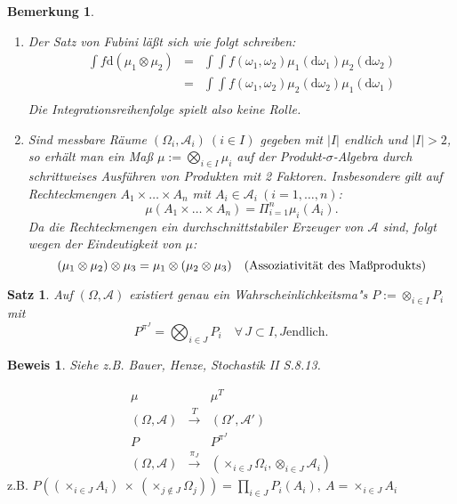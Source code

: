 \documentclass[a4paper,11pt]{book}
\def\AA{ \mathcal{A} }
\def\d{\mbox{d}}
\newtheorem{Sa}{Satz}[chapter]
\newtheorem{Bem}{Bemerkung}[chapter]
\theoremstyle{nonumberplain}
\newtheorem{Bew}{Beweis}
\begin{document}
\begin{Bem} \quad\\
\begin{enumerate}
\item[a)] Der Satz von Fubini läßt sich wie folgt schreiben:
\begin{eqnarray*}
\int f\d\left(\mu_1\otimes\mu_2\right) & = & \int\int f\left(\omega_1,\omega_2\right)\mu_1\left(\d\omega_1\right)\mu_2\left(\d\omega_2\right) \\
 & = & \int\int f\left(\omega_1,\omega_2\right)\mu_2\left(\d\omega_2\right)\mu_1\left(\d\omega_1\right) \\
\end{eqnarray*}
Die Integrationsreihenfolge spielt also keine Rolle.
\item[b)] Sind messbare Räume $(\Omega_i,\AA_i)\ (i\in I)$ gegeben mit $|I|$ endlich und $|I|>2$, so erhält man ein Maß $\mu:=\bigotimes_{i\in I}\mu_i$ auf der Produkt-$\sigma$-Algebra durch schrittweises Ausführen von Produkten mit 2 Faktoren. Insbesondere gilt auf Rechteckmengen $A_1\times\dots\times A_n$ mit $A_i\in\AA_i\ (i=1,\dots,n)$:
$$\mu(A_1\times\dots\times A_n) = \Pi_{i=1}^n\mu_i(A_i).$$
Da die Rechteckmengen ein durchschnittstabiler Erzeuger von $\AA$ sind, folgt wegen der Eindeutigkeit von $\mu$: \\
$$(\mu_1\otimes\mu_2)\otimes\mu_3 = \mu_1\otimes(\mu_2\otimes\mu_3)\text{\quad(Assoziativität des Maßprodukts)}$$
\end{enumerate}
\end{Bem}

\begin{Sa}
Auf $(\Omega,\AA)$ existiert genau ein Wahrscheinlichkeitsma"s $P:= \otimes_{i \in I} P_i$ 
mit
$$P^{\pi^J} = \bigotimes_{i \in J}P_i \quad \forall\, J \subset I, J \text{endlich}.$$
\end{Sa}

\begin{Bew}
Siehe z.B. Bauer, Henze, Stochastik II S.8.13.
\end{Bew}

\[
\begin{array}{ccc}
\mu & & \mu^T \\
(\Omega,\AA) & \stackrel{T}{\longrightarrow} & (\Omega',\AA') \\
P & & P^{\pi^J} \\
(\Omega,\AA) & \stackrel{\pi_J}{\longrightarrow} & (\times_{i \in J} 
\Omega_i, \otimes_{i \in J} \AA_i)
\end{array}
\]
z.B. $P((\times_{i \in J} A_i)\ \times\ (\times_{j \notin J} \Omega_j)) = 
\prod_{i \in J} P_i(A_i), \ A = \times_{i \in J} A_i$
\end{document}
